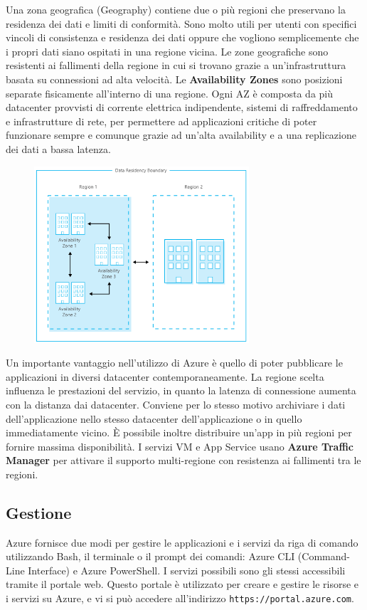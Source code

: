 Una zona geografica (Geography) contiene due o più regioni che preservano la residenza dei dati e limiti di conformità. Sono molto utili per utenti con specifici vincoli di consistenza e residenza dei dati oppure che vogliono semplicemente che i propri dati siano ospitati in una regione vicina. Le zone geografiche sono resistenti ai fallimenti della regione in cui si trovano grazie a un'infrastruttura basata su connessioni ad alta velocità. Le \textbf{Availability Zones} sono posizioni separate fisicamente all'interno di una regione. Ogni AZ è composta da più datacenter provvisti di corrente elettrica indipendente, sistemi di raffreddamento e infrastrutture di rete, per permettere ad applicazioni critiche di poter funzionare sempre e comunque grazie ad un'alta availability e a una replicazione dei dati a bassa latenza.

\begin{figure}[htb!]
    \centering
    \includegraphics[width=8cm]{./Images/cap14/14.2.png}
\end{figure}

Un importante vantaggio nell'utilizzo di Azure è quello di poter pubblicare le applicazioni in diversi datacenter contemporaneamente. La regione scelta influenza le prestazioni del servizio, in quanto la latenza di connessione aumenta con la distanza dai datacenter. Conviene per lo stesso motivo archiviare i dati dell'applicazione nello stesso datacenter dell'applicazione o in quello immediatamente vicino. È possibile inoltre distribuire un'app in più regioni per fornire massima disponibilità. I servizi VM e App Service usano \textbf{Azure Traffic Manager} per attivare il supporto multi-regione con resistenza ai fallimenti tra le regioni.

\subsection{Gestione}
Azure fornisce due modi per gestire le applicazioni e i servizi da riga di comando utilizzando Bash, il terminale o il prompt dei comandi: Azure CLI (Command-Line Interface) e Azure PowerShell. I servizi possibili sono gli stessi accessibili tramite il portale web. Questo portale è utilizzato per creare e gestire le risorse e i servizi su Azure, e vi si può accedere all'indirizzo \texttt{https://portal.azure.com}.

